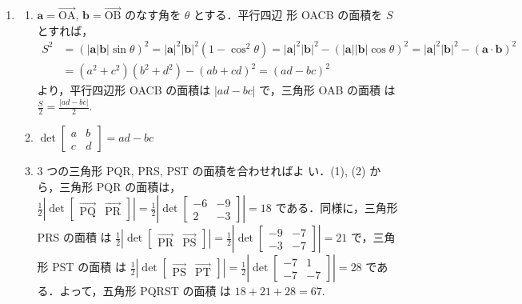 \documentclass[11pt, uplatex, dvipdfmx]{jsarticle}
\renewcommand*{\vec}[1]{\overrightarrow{\textrm{#1}}}
\begin{document}
\begin{enumerate}
  \setlength{\itemsep}{1zh}
  
\item \label{area}
  \begin{enumerate}[(1)]
    \setlength{\itemsep}{1ex}
    
  \item $\bm{a} = \vec{OA}, \, \bm{b} = \vec{OB}$ のなす角を $\theta$ とする．平行四辺
    形 OACB の面積を $S$ とすれば，
    \[
      \begin{aligned}
        S^2 &= \left( |\bm{a}| \bm{b}| \sin \theta\right)^2
              = |\bm{a}|^2 |\bm{b}|^2 ( 1-\cos^2\theta)
              =|\bm{a}|^2|\bm{b}|^2 - \left(|\bm{a}||\bm{b}|\cos\theta\right)^2
              =|\bm{a}|^2|\bm{b}|^2 - \left(\bm{a} \cdot \bm{b}\right)^2\\
        &= (a^2+c^2)(b^2+d^2) - (ab+cd)^2 = (ad-bc)^2
      \end{aligned}
    \]
    より，平行四辺形 OACB の面積は $|ad-bc|$ で，三角形 OAB の面積
    は $\frac{S}{2}= \frac{|ad-bc|}{2}$.
    
  \item $\det \left[
      \begin{array}{cc}
        a & b\\
        c & d
      \end{array}
      \right] = ad-bc$

    \item $3$ つの三角形 PQR, PRS, PST の面積を合わせればよ
      い．(1), (2) から，三角形 PQR の面積は，$\frac{1}{2}\left| \det\left[
          \begin{array}{cc}
            \vec{PQ} & \vec{PR}
          \end{array}
        \right]\right| = \frac{1}{2} \left|\det\left[
          \begin{array}{rr}
            -6 & -9\\
             2 &  -3  
          \end{array}
        \right]\right|=18$ である．同様に，三角形 PRS の面積
      は $\frac{1}{2}\left| \det\left[
          \begin{array}{cc}
            \vec{PR} & \vec{PS}
          \end{array}
          \right] \right| = \frac{1}{2}\left| \det\left[
            \begin{array}{rr}
              -9 & -7\\
              -3 & -7
            \end{array}
          \right] \right| = 21$ で，三角形 PST の面積
        は $\frac{1}{2}\left| \det\left[
              \begin{array}{cc}
                \vec{PS} & \vec{PT}
              \end{array}
            \right]\right| = \frac{1}{2}\left| \det\left[
              \begin{array}{rr}
                -7 & 1\\
                -7 & -7
              \end{array}
            \right]\right| = 28$ である．よって，五角形 PQRST の面積
          は $18+21+28=67$.
      

\end{enumerate}
\end{enumerate}
\end{document}
